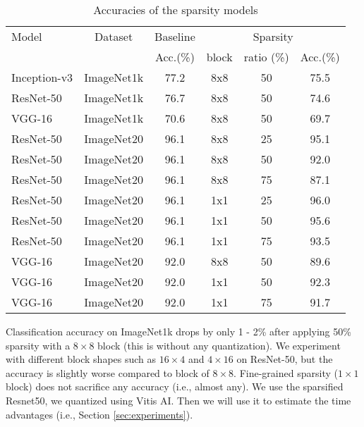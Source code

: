 \documentclass[conference]{IEEEtran}
\begin{document}
\begin{table}[ht]
\caption{Accuracies of the sparsity models}
\label{tab_acc}
\begin{center} 
\scalebox{0.9}
{
\begin{tabular}{|l|c|c|c|c|c|}
\hline
\rule[-1ex]{0pt}{3.5ex}  Model & Dataset & Baseline  & \multicolumn{3}{c|}{Sparsity}\\
\rule[-1ex]{0pt}{3.5ex}  {} & {} & Acc.(\%) & block & ratio (\%) & Acc.(\%)    \\\hline\hline
\rule[-1ex]{0pt}{3.5ex}  Inception-v3 & ImageNet1k & 77.2 & 8x8 & 50 & 75.5  \\\hline
\rule[-1ex]{0pt}{3.5ex}  ResNet-50 & ImageNet1k & 76.7 & 8x8 & 50 & 74.6  \\\hline
\rule[-1ex]{0pt}{3.5ex}  VGG-16    & ImageNet1k & 70.6 & 8x8 & 50 & 69.7  \\\hline \hline
\rule[-1ex]{0pt}{3.5ex}  ResNet-50 & ImageNet20 & 96.1 & 8x8 & 25 & 95.1  \\\hline
\rule[-1ex]{0pt}{3.5ex}  ResNet-50 & ImageNet20 & 96.1 & 8x8 & 50 & 92.0  \\\hline
\rule[-1ex]{0pt}{3.5ex}  ResNet-50 & ImageNet20 & 96.1 & 8x8 & 75 & 87.1  \\\hline
\rule[-1ex]{0pt}{3.5ex}  ResNet-50 & ImageNet20 & 96.1 & 1x1 & 25 & 96.0  \\\hline
\rule[-1ex]{0pt}{3.5ex}  ResNet-50 & ImageNet20 & 96.1 & 1x1 & 50 & 95.6  \\\hline
\rule[-1ex]{0pt}{3.5ex}  ResNet-50 & ImageNet20 & 96.1 & 1x1 & 75 & 93.5  \\\hline
\rule[-1ex]{0pt}{3.5ex}  VGG-16    & ImageNet20 & 92.0 & 8x8 & 50 & 89.6  \\\hline
\rule[-1ex]{0pt}{3.5ex}  VGG-16    & ImageNet20 & 92.0 & 1x1 & 50 & 92.3  \\\hline
\rule[-1ex]{0pt}{3.5ex}  VGG-16    & ImageNet20 & 92.0 & 1x1 & 75 & 91.7  \\\hline
\end{tabular}\vspace{-20pt}
}
\end{center}
\end{table}

Classification accuracy on ImageNet1k drops by only 1 - 2\% after
applying 50\% sparsity with a $8\times 8$ block (this is without any
quantization). We experiment with different block shapes such as
$16\times 4$ and $4\times 16$ on ResNet-50, but the accuracy is
slightly worse compared to block of $8\times 8$. Fine-grained sparsity
($1\times 1$ block) does not sacrifice any accuracy (i.e., almost
any).  We use the sparsified Resnet50, we quantized using Vitis AI.
Then we will use it to estimate the time advantages (i.e., Section
\ref{sec:experiments}).
\end{document}

